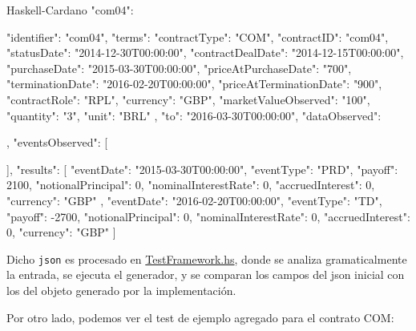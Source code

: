 \documentclass[12pt]{book}
\begin{document}
\begin{code}[title=Test propuesto por ACTUS para el contrato COM.]{Haskell-Cardano}
"com04": {
        "identifier": "com04",
        "terms": {
            "contractType": "COM",
            "contractID": "com04",
            "statusDate": "2014-12-30T00:00:00",
            "contractDealDate": "2014-12-15T00:00:00",
            "purchaseDate": "2015-03-30T00:00:00",
            "priceAtPurchaseDate": "700",
            "terminationDate": "2016-02-20T00:00:00",
            "priceAtTerminationDate": "900",
            "contractRole": "RPL",
            "currency": "GBP",
            "marketValueObserved": "100",
            "quantity": "3",
            "unit": "BRL"
        },
        "to": "2016-03-30T00:00:00",
        "dataObserved": {

        },
        "eventsObserved": [

        ],
        "results": [
            {
                "eventDate": "2015-03-30T00:00:00",
                "eventType": "PRD",
                "payoff": 2100,
                "notionalPrincipal": 0,
                "nominalInterestRate": 0,
                "accruedInterest": 0,
                "currency": "GBP"
            },
            {
                "eventDate": "2016-02-20T00:00:00",
                "eventType": "TD",
                "payoff": -2700,
                "notionalPrincipal": 0,
                "nominalInterestRate": 0,
                "accruedInterest": 0,
                "currency": "GBP"
            }
        ]
    }
\end{code}

Dicho \texttt{json} es procesado en \href{https://github.com/input-output-hk/marlowe-cardano/blob/main/marlowe-actus/test/Spec/Marlowe/ACTUS/TestFramework.hs}{TestFramework.hs}, donde se analiza gramaticalmente la entrada, se ejecuta el generador, y se comparan los campos del json inicial con los del objeto generado por la implementación.

Por otro lado, podemos ver el test de ejemplo agregado para el contrato COM:\@
\end{document}
